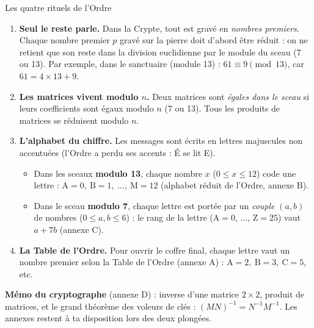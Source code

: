 \documentclass[11pt,a4paper]{article}
\begin{document}
	\begin{rituel}{Les quatre rituels de l'Ordre}
		\begin{enumerate}[label=\textbf{R\arabic*.},leftmargin=10mm]
			\item \textbf{Seul le reste parle.} Dans la Crypte, tout est gravé en
			\emph{nombres premiers}. Chaque nombre premier $p$ gravé sur la pierre
			doit d'abord être réduit : on ne retient que son reste dans la division
			euclidienne par le module du sceau (7 ou 13).
			Par exemple, dans le sanctuaire (module 13) : $61 \equiv 9 \pmod{13}$,
			car $61 = 4\times 13 + 9$.
			\item \textbf{Les matrices vivent modulo $n$.} Deux matrices sont
			\emph{égales dans le sceau} si leurs coefficients sont égaux modulo $n$
			(7 ou 13). Tous les produits de matrices se réduisent modulo $n$.
			\item \textbf{L'alphabet du chiffre.} Les messages sont écrits en lettres
			majuscules non accentuées (l'Ordre a perdu ses accents : É se lit E).
			\begin{itemize}
				\item Dans les sceaux \textbf{modulo 13}, chaque nombre $x$
				($0\leqslant x \leqslant 12$) code une lettre :
				$\text{A}=0,\ \text{B}=1,\ \dots,\ \text{M}=12$
				(alphabet réduit de l'Ordre, annexe B).
				\item Dans le sceau \textbf{modulo 7}, chaque lettre est portée par un
				\emph{couple} $(a,b)$ de nombres ($0\leqslant a,b\leqslant 6$) :
				le rang de la lettre ($\text{A}=0$, $\dots$, $\text{Z}=25$) vaut
				$a + 7b$ (annexe C).
			\end{itemize}
			\item \textbf{La Table de l'Ordre.} Pour ouvrir le coffre final, chaque lettre
			vaut un nombre premier selon la Table de l'Ordre (annexe A) :
			$\text{A}=2,\ \text{B}=3,\ \text{C}=5$, etc.
		\end{enumerate}
	\end{rituel}
	
	\begin{conseil}
		\textbf{Mémo du cryptographe} (annexe D) : inverse d'une matrice $2\times 2$,
		produit de matrices, et le grand théorème des voleurs de clés :
		$(M N)^{-1} = N^{-1} M^{-1}$. Les annexes restent à ta disposition
		lors des deux plongées.
	\end{conseil}
	
\newpage
\end{document}
